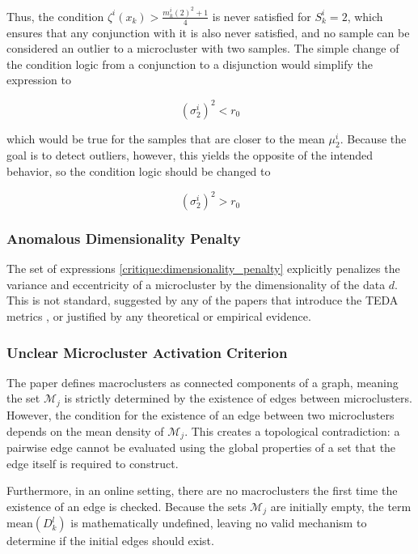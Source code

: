 \documentclass[a4paper]{article}
\begin{document}
Thus, the condition $\zeta^i(x_k) > \frac{m^i_k(2)^2 + 1}{4}$ is never satisfied for $S^i_k = 2$, which ensures that any conjunction with it is also never satisfied, and no sample can be considered an outlier to a microcluster with two samples. The simple change of the condition logic from a conjunction to a disjunction would simplify the expression to

\begin{equation}
    \left( \sigma^i_2 \right)^2 < r_0
\end{equation}

which would be true for the samples that are closer to the mean $\mu^i_2$. Because the goal is to detect outliers, however, this yields the opposite of the intended behavior, so the condition logic should be changed to

\begin{equation}
    \left( \sigma^i_2 \right)^2 > r_0
\end{equation}

\subsubsection{Anomalous Dimensionality Penalty} \label{sss:dimensionality_penalty}

The set of expressions \ref{critique:dimensionality_penalty} explicitly penalizes the variance and eccentricity of a microcluster by the dimensionality of the data $d$. This is not standard, suggested by any of the papers that introduce the TEDA metrics \cite{angelov2014outside, angelov2014anomaly}, or justified by any theoretical or empirical evidence.

\subsubsection{Unclear Microcluster Activation Criterion} \label{sss:unclear_microcluster_activation_criterion}

The paper defines macroclusters as connected components of a graph, meaning the set $\mathcal{M}_j$ is strictly determined by the existence of edges between microclusters. However, the condition for the existence of an edge between two microclusters depends on the mean density of $\mathcal{M}_j$. This creates a topological contradiction: a pairwise edge cannot be evaluated using the global properties of a set that the edge itself is required to construct.

Furthermore, in an online setting, there are no macroclusters the first time the existence of an edge is checked. Because the sets $\mathcal{M}_j$ are initially empty, the term $\text{mean}\left(D^l_k\right)$ is mathematically undefined, leaving no valid mechanism to determine if the initial edges should exist.
\end{document}
